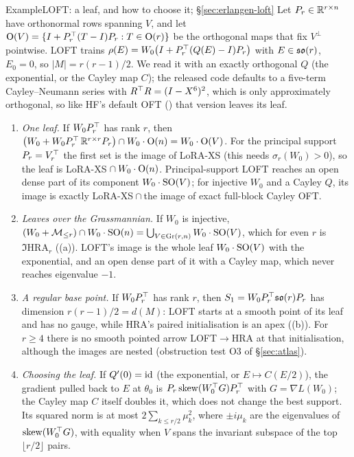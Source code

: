 \begin{restate}{Example}{\unskip}{LOFT: a leaf, and how to choose it; \S\ref{sec:erlangen-loft}}
Let $P_r\in\mathbb{R}^{r\times n}$ have orthonormal rows spanning $V$, and let $\mathrm{O}(V)=\{I+P_r^{\top}(T-I)P_r:T\in\mathrm{O}(r)\}$ be the
orthogonal maps that fix $V^\perp$ pointwise. LOFT trains $\rho(E)=W_0\big(I+P_r^{\top}(Q(E)-I)P_r\big)$ with $E\in\mathfrak{so}(r)$,
$E_0=0$, so $\lvert M\rvert=r(r-1)/2$. We read it with an exactly orthogonal $Q$ (the exponential, or the Cayley map
$C$); the released code defaults to a five-term Cayley--Neumann series with $R^{\top} R=(I-X^6)^2$, which is only
approximately orthogonal, so like HF's default OFT () that version leaves its leaf.
\begin{enumerate}[label=(\alph*)]
  \item \emph{One leaf.} If $W_0P_r^{\top}$ has rank $r$, then
    $\big(W_0+W_0P_r^{\top}\,\mathbb{R}^{r\times r}P_r\big)\cap W_0\cdot\mathrm{O}(n)=W_0\cdot\mathrm{O}(V)$. For the principal support
    $P_r=V_r^{\top}$ the first set is the image of LoRA-XS (this needs $\sigma_r(W_0)>0$), so the leaf is
    LoRA-XS${}\cap W_0\cdot\mathrm{O}(n)$. Principal-support LOFT reaches an open dense part of its component $W_0\cdot\mathrm{SO}(V)$;
    for injective $W_0$ and a Cayley $Q$, its image is exactly LoRA-XS${}\cap{}$the image of exact full-block Cayley
    OFT.
  \item \emph{Leaves over the Grassmannian.} If $W_0$ is injective,
    $(W_0+\mathcal{M}_{\le r})\cap W_0\cdot\mathrm{SO}(n)=\bigcup_{V\in\operatorname{Gr}(r,n)}W_0\cdot\mathrm{SO}(V)$, which for even $r$ is $\Im\mathrm{HRA}_r$
    ((a)). LOFT's image is the whole leaf $W_0\cdot\mathrm{SO}(V)$ with the exponential, and an open dense
    part of it with a Cayley map, which never reaches eigenvalue $-1$.
  \item \emph{A regular base point.} If $W_0P_r^{\top}$ has rank $r$, then $S_1=W_0P_r^{\top}\mathfrak{so}(r)P_r$ has dimension
    $r(r-1)/2=d(M)$: LOFT starts at a smooth point of its leaf and has no gauge, while HRA's paired initialisation is an
    apex ((b)). For $r\ge4$ there is no smooth pointed arrow LOFT${}\to{}$HRA at that
    initialisation, although the images are nested (obstruction test O3 of \S\ref{sec:atlas}).
  \item \emph{Choosing the leaf.} If $Q'(0)=\mathrm{id}$ (the exponential, or $E\mapsto C(E/2)$), the gradient pulled back to $E$
    at $\theta_0$ is $P_r\operatorname{skew}(W_0^{\top} G)P_r^{\top}$ with $G=\nabla L(W_0)$; the Cayley map $C$ itself doubles it, which does
    not change the best support. Its squared norm is at most $2\sum_{k\le r/2}\mu_k^2$, where $\pm i\mu_k$ are the
    eigenvalues of $\operatorname{skew}(W_0^{\top} G)$, with equality when $V$ spans the invariant subspace of the top $\lfloor r/2\rfloor$
    pairs.
\end{enumerate}
\end{restate}

